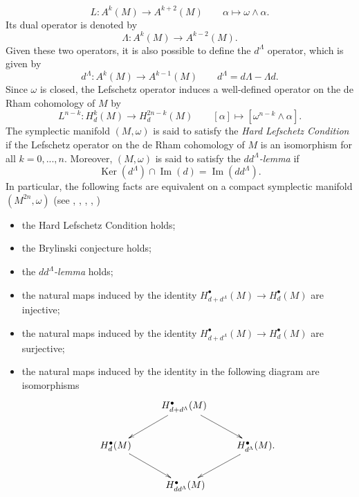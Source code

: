 \documentclass[a4paper, 11pt]{amsart}
\theoremstyle{plain}
\theoremstyle{definition}
\DeclareMathOperator{\Ker}{Ker}
\DeclareMathOperator{\im}{Im}
\numberwithin{equation}{section}
\begin{document}
{\begin{equation}\label{DefLefschetz}
     L : A^{k}(M) \rightarrow A^{k+2}(M) \qquad \alpha \mapsto \omega \wedge \alpha.
\end{equation}
Its dual operator is denoted by
\[ \Lambda: A^{k}(M) \rightarrow A^{k-2}(M). \]
Given these two operators, it is also possible to define the $d^{\Lambda}$ operator, which is given by
\begin{equation}\label{dLambda}
    d^{\Lambda}: A^{k}(M) \rightarrow A^{k-1}(M) \qquad d^{\Lambda} = d\Lambda - \Lambda d. 
\end{equation}
Since $\omega$ is closed, the Lefschetz operator induces a well-defined operator on the de Rham cohomology of $M$ by
\begin{equation}\label{DefLefschetzRham}
        L^{n-k} : H^{k}_{d}(M) \rightarrow H^{2n-k}_{d}(M) \qquad [\alpha] \mapsto [\omega^{n-k} \wedge \alpha].
\end{equation}
The symplectic manifold $(M, \omega)$ is said to satisfy the \textit{Hard Lefschetz Condition} if the Lefschetz operator on the de Rham cohomology of $M$ is an isomorphism for all $k = 0, ..., n$. Moreover, $(M, \omega)$ is said to satisfy the \textit{$dd^{\Lambda}$-lemma} if 
\begin{equation*}
    \Ker(d^{\Lambda}) \cap \im(d) = \im(dd^{\Lambda}).
\end{equation*}
In particular, the following facts are equivalent on a compact symplectic
manifold $(M^{2n},\omega)$ (see \cite{Brylinski}, \cite{Mathieu}, \cite{merkulov},
\cite{Yan}, \cite{cavalcanti})
\begin{itemize}
\item{} the Hard Lefschetz Condition  holds;
\item{} the Brylinski conjecture holds;
\item{} the \emph{$dd^\Lambda$-lemma} holds;
\item{} the natural maps induced by the identity $H^{\bullet}_{d+d^\Lambda}(M)
\longrightarrow H^{\bullet}_{d}(M)$ are injective;
\item{} the natural maps induced by the identity $H^{\bullet}_{d+d^\Lambda}(M)
\longrightarrow H^{\bullet}_{d}(M)$ are surjective;
\item{} the natural maps induced by the identity in the following diagram are isomorphisms
$$ \xymatrix{
  & H^{\bullet}_{d+d^\Lambda}(M) \ar[ld]\ar[rd] & \\
  H^{\bullet}_{d}(M) \ar[rd] &  & H^{\bullet}_{d^\Lambda}(M). \ar[ld] \\
  & {\phantom{\;.}} H^{\bullet}_{dd^\Lambda}(M) \; &
} $$
\end{itemize}

}
\end{document}
